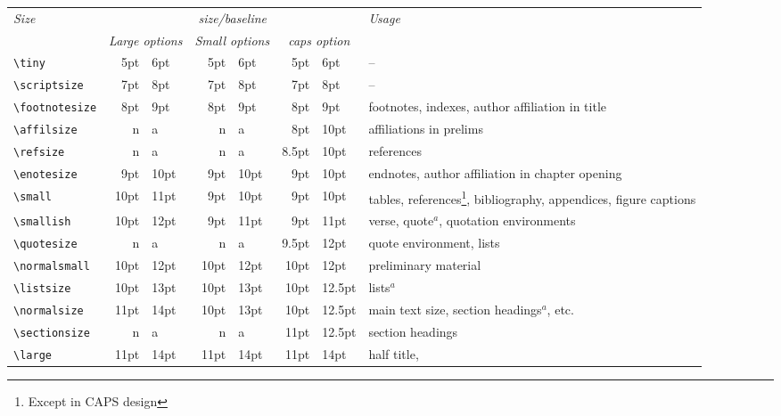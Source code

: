 \documentclass[cup6a]{cupbook}
\begin{document}
\begin{table*}[hbt]
\caption{Type sizes for \LaTeX\ size-changing commands.}
\label{tab:fontsizes}
 \begin{tabular}{l|r@{/}lr@{/}lr@{/}lp{4cm}}
 \hline\hline
  \multicolumn{1}{l|}{\it Size}&\multicolumn{6}{c|}{\it size/baseline} & \it Usage\\
& \multicolumn{2}{c}{\it Large options} & \multicolumn{2}{c}{\it Small options} & \multicolumn{2}{c}{\it caps option} & \\
 \hline
 \verb"\tiny"         &  5pt &  6pt &  5pt &  6pt & 5pt & 6pt & -- \\
 \verb"\scriptsize"   &  7pt &  8pt &  7pt &  8pt & 7pt &  8pt & -- \\
 \verb"\footnotesize" &  8pt &  9pt &  8pt &  9pt & 8pt &  9pt & footnotes,
                   indexes, author affiliation in title \\
 \verb"\affilsize"    &  n   &  a   &  n   & a    & 8pt & 10pt &
                   affiliations in prelims\\
 \verb"\refsize"      &  n   &  a   &  n   & a    & 8.5pt & 10pt &
                   references\\ 
 \verb"\enotesize"    &  9pt & 10pt &  9pt & 10pt & 9pt & 10pt & endnotes,
                   author affiliation in chapter opening \\
 \verb"\small"        & 10pt & 11pt &  9pt & 10pt & 9pt & 10pt & tables,
                   references\footnote{Except in CAPS design}, bibliography,
                   appendices, figure captions\\
 \verb"\smallish"     & 10pt & 12pt &  9pt & 11pt & 9pt & 11pt & verse,
                   quote$^a$, quotation environments\\
 \verb"\quotesize"    &  n   &  a   &  n   & a    & 9.5pt & 12pt &
                   quote environment, lists\\ 
 \verb"\normalsmall"  & 10pt & 12pt & 10pt & 12pt & 10pt & 12pt & preliminary
                   material\\
 \verb"\listsize"     & 10pt & 13pt & 10pt & 13pt & 10pt & 12.5pt & lists$^a$ \\
 \verb"\normalsize"   & 11pt & 14pt & 10pt & 13pt & 10pt & 12.5pt & main text
                   size, section headings$^a$, etc.\\
 \verb"\sectionsize"  &  n   &  a   &  n   & a    & 11pt & 12.5pt &
                   section headings\\ 
 \verb"\large"        & 11pt & 14pt & 11pt & 14pt & 11pt & 14pt & half title,

\end{tabular}
\end{table*}
\end{document}
